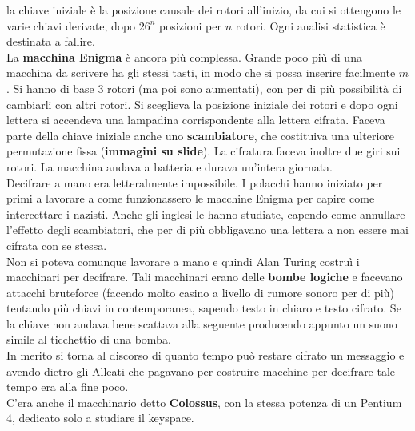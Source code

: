 \documentclass[a4paper,12pt, oneside]{book}
\begin{document}
la chiave iniziale è la posizione causale dei rotori all'inizio, da cui si
ottengono le varie chiavi derivate, dopo $26^n$ posizioni per $n$ rotori. Ogni
analisi statistica è destinata a fallire.\\
La \textbf{macchina Enigma} è ancora più complessa. Grande poco più di una
macchina da scrivere ha gli stessi tasti, in modo che si possa inserire
facilmente $m$. Si hanno di base 3 rotori (ma poi sono aumentati), con per di
più possibilità di 
cambiarli con altri rotori. Si sceglieva la posizione iniziale dei rotori e dopo
ogni lettera si accendeva una lampadina corrispondente alla lettera
cifrata. Faceva parte della chiave iniziale anche uno \textbf{scambiatore}, che
costituiva una ulteriore permutazione fissa (\textbf{immagini su slide}). La
cifratura faceva inoltre due giri sui rotori. La
macchina andava a batteria e durava un'intera giornata. \\
Decifrare a mano era letteralmente impossibile. I polacchi hanno iniziato per
primi a lavorare a come funzionassero le macchine Enigma per capire come
intercettare i nazisti. Anche gli inglesi le hanno studiate, capendo come
annullare l'effetto degli scambiatori, che per di più obbligavano una lettera a
non essere mai cifrata con se stessa.\\
Non si poteva comunque lavorare a mano e quindi Alan Turing costruì i macchinari
per decifrare. Tali macchinari erano delle \textbf{bombe logiche} e facevano
attacchi bruteforce (facendo molto casino a livello di rumore sonoro per di
più) tentando più chiavi in contemporanea, sapendo testo in chiaro e testo
cifrato. Se la chiave non andava bene scattava alla seguente producendo appunto
un suono simile al ticchettio di una bomba.\\
In merito si torna al discorso di quanto tempo può restare cifrato un messaggio
e avendo dietro gli Alleati che pagavano per costruire macchine per decifrare
tale tempo era alla fine poco.\\
C'era anche il macchinario detto \textbf{Colossus}, con la stessa potenza di un
Pentium 4, dedicato solo a studiare il keyspace.
\end{document}
